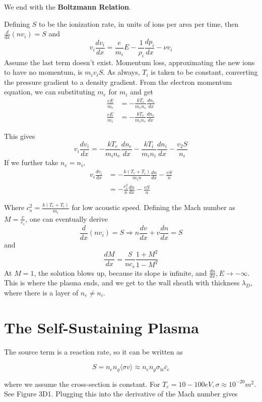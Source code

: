 \documentclass[12pt]{article}
\begin{document}
We end with the \textbf{Boltzmann Relation}.

Defining $S$ to be the ionization rate, in units of ions per area per time, then $\frac{d}{dx}(nv_i) = S$ and
$$v_i \frac{dv_i}{dx} = \frac{e}{m_i} E - \frac{1}{\rho_i} \frac{dp_i}{dx} - \nu v_i$$
Assume the last term doesn't exist. Momentum loss, approximating the new ions to have no momentum, is $m_iv_iS$. As always, $T_i$ is taken to be constant, converting the pressure gradient to a density gradient. From the electron momentum equation, we can substituting $m_e$ for $m_i$ and get
\begin{align*}
    \frac{eE}{m_e} &= -\frac{kT_e}{m_en_e} \frac{dn_e}{dx} \\
    \frac{eE}{m_i} & =-\frac{kT_e}{m_in_e} \frac{dn_e}{dx}
\end{align*}

This gives
$$v_i \frac{dv_i}{dx} = -\frac{kT_e}{m_in_e} \frac{dn_e}{dx} - \frac{kT_i}{m_in_i} \frac{dn_i}{dx} - \frac{v_2S}{n_i}$$
If we further take $n_e = n_i$,
\begin{align*}
    v_i \frac{dv_i}{dx} &= -\frac{k(T_e+T_i)}{m_in} \frac{dn}{dx} - \frac{vS}{n} \\
                        &= -\frac{c_s^2}{n} \frac{dn}{dx} - \frac{vS}{n}
\end{align*}

Where $c_s^2 = \frac{k(T_e+T_i)}{m_i}$ for low acoustic speed. Defining the Mach number as $M = \frac{v}{c_s}$, one can eventually derive
$$\frac{d}{dx}(nv_i) = S \Rightarrow n \frac{dv}{dx} + v \frac{dn}{dx} = S$$
and
$$\frac{dM}{dx} = \frac{S}{nc_s} \frac{1+M^2}{1-M^2}$$
At $M = 1$, the solution blows up, because its slope is infinite, and $\frac{dn}{dx}, E \rightarrow -\infty$. This is where the plasma ends, and we get to the wall sheath with thickness $\lambda_D$, where there is a layer of $n_e \neq n_i$.

\section{The Self-Sustaining Plasma}

The source term is a reaction rate, so it can be written as

$$S = n_en_g\langle \sigma v \rangle \approx n_en_g \sigma_{\text{iz}} \overline c_e$$

where we assume the cross-section is constant. For $T_e = 10 - 100 \unit{eV}, \sigma \approx 10^{-20} \unit{m^2}$. See Figure 3D1. Plugging this into the derivative of the Mach number gives
\end{document}

